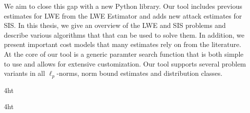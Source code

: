 \documentclass[
  a4paper,  %
  twoside,  %
  bibliography=totoc,
  headsepline,
  cleardoublepage=empty,
  parskip=half,
  draft=false
]{scrbook}
\begin{document}
We aim to close this gap with a new Python library. Our tool includes previous estimates for LWE from the LWE Estimator and adds new attack estimates for SIS. In this thesis, we give an overview of the LWE and SIS problems and describe various algorithms that that can be used to solve them. In addition, we present important cost models that many estimates rely on from the literature. At the core of our tool is a generic paramter search function that is both simple to use and allows for extensive customization. Our tool supports several problem variants in all $\ell_p$-norms, norm bound estimates and distribution classes.

\cleardoublepage



\iftex4ht
\else
\fi

%
%

%
%
%
\tableofcontents


\listoffigures
\listoftables

\ifdeutsch
\else
\fi

\listofalgorithms %

\printnoidxglossaries

\iftex4ht
\else
\fi
\end{document}
